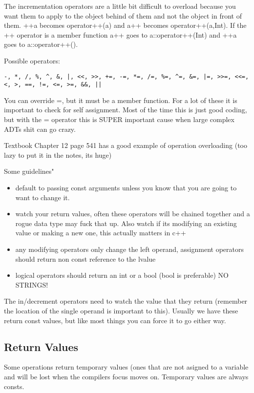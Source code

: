 \documentclass[12pt]{article}
\begin{document}
The incrementation operators are a little bit difficult to overload because you want them to apply to the object behind of them and not the object in front of them. ++a becomes operator++(a) and a++ becomes operator++(a,Int). If the ++ operator is a member function a++ goes to a::operator++(Int) and ++a goes to a::operator++().

Possible operators:
\begin{lstlisting}
-, *, /, %, ^, &, |, <<, >>, +=, -=, *=, /=, %=, ^=, &=, |=, >>=, <<=, <, >, ==, !=, <=, >=, &&, ||
\end{lstlisting}
You can override =, but it must be a member function. For a lot of these it is important to check for self assignment. Most of the time this is just good coding, but with the =  operator this is SUPER important cause when large complex ADTs shit can go crazy.

Textbook Chapter 12 page 541 has a good example of operation overloading (too lazy to put it in the notes, its huge)

Some guidelines"
\begin{itemize}
\item default to passing const arguments unless you know that you are going to want to change it.
\item watch your return values, often these operators will be chained together and a rogue data type may fuck that up. Also watch if its modifying an existing value or making a new one, this actually matters in c++
\item any modifying operators only change the left operand, assignment operators should return non const reference to the lvalue
\item logical operators should return an int or a bool (bool is preferable) NO STRINGS!
\end{itemize}

The in/decrement operators need to watch the value that they return (remember the location of the single operand is important to this). Usually we have these return const values, but like most things you can force it to go either way.

\subsection*{Return Values}
Some operations return temporary values (ones that are not asigned to a variable and will be lost when the compilers focus moves on. Temporary values are always consts.
\end{document}
